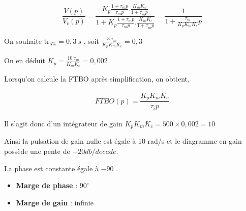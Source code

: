 
\begin{texteCache}

\[\frac{V(p)}{V_{c}(p)} = \frac{K_{p}\frac{1 + \tau_{m}p}{\tau_{m}p}.\frac{K_{m}K_{c}}{{1 + \tau}_{m}p}}{1 + K_{p}\frac{1 + \tau_{m}p}{\tau_{m}p}.\frac{K_{m}K_{c}}{{1 + \tau}_{m}p}} = \frac{1}{1 + \frac{\tau_{m}}{K_{p}K_{m}K_{c}}p}\]
\vspace{3cm}
\end{texteCache}


\begin{texteCache}
On souhaite \(\text{tr}_{5\%} = 0,3\ s\) , soit
\(\frac{3.\tau_{m}}{K_{p}K_{m}K_{c}} = 0,3\)

On en déduit \(K_{p} = \frac{10.\tau_{m}}{K_{m}K_{c}} = 0,002\)

\vspace{3cm}
\end{texteCache}


\begin{texteCache}
Lorsqu'on calcule la FTBO après simplification, on obtient,

\begin{align*}
FTBO(p)=\dfrac{K_pK_mK_c}{\tau_i p}
\end{align*}

Il s'agit donc d'un intégrateur de gain $K_pK_mK_c=500\times 0,002=10 $

Ainsi la pulsation de gain nulle est égale à 10 rad/s et le diagramme en gain possède une pente de $-20db/decade$.

La phase est constante égale à $-90^{\circ}$.

\begin{itemize}
\item \textbf{Marge de phase} : $90^{\circ}$
\item \textbf{Marge de gain} : infinie
\end{itemize}

\end{texteCache}


